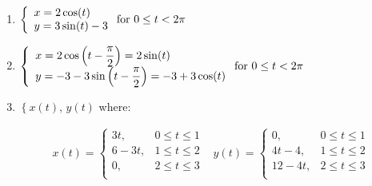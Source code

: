 \begin{enumerate}
\setcounter{enumi}{\value{HW}}

\item   ${\displaystyle \left\{ \begin{array}{l} x = 2\cos(t) \\ y = 3\sin(t)-3  \end{array} \right. \vspace{.25in} \mbox{for } 0 \leq t < 2\pi }$

\item  ${\displaystyle \left\{ \begin{array}{l} x = 2\cos\left(t-\dfrac{\pi}{2}\right) = 2\sin(t) \\ y = -3 - 3\sin\left(t-\dfrac{\pi}{2}\right) =  -3+3\cos(t) \end{array} \right. \vspace{.25in} \mbox{for } 0 \leq t <  2\pi}$

\item  $\left\{ x(t), \, y(t) \right.$ where:

\[ \begin{array}{cc}

x(t) = \left\{ \begin{array}{rr}  3t,& 0 \leq t \leq 1 \\
																	6-3t, & 1 \leq t \leq 2 \\
																	0, & 2 \leq t \leq 3 \\ \end{array} \right.
&

y(t) = \left\{ \begin{array}{rr}  0,& 0 \leq t \leq 1 \\
																	4t-4, & 1 \leq t \leq 2 \\
																	12-4t, & 2 \leq t \leq 3 \\ \end{array} \right.



\end{array}\]


\setcounter{HW}{\value{enumi}}
\end{enumerate}

